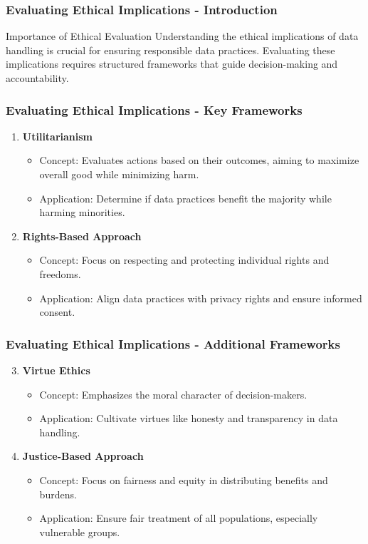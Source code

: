 \documentclass[aspectratio=169]{beamer}
\begin{document}
\begin{frame}[fragile]
    \frametitle{Evaluating Ethical Implications - Introduction}
    \begin{block}{Importance of Ethical Evaluation}
        Understanding the ethical implications of data handling is crucial for ensuring responsible data practices. Evaluating these implications requires structured frameworks that guide decision-making and accountability.
    \end{block}
\end{frame}

\begin{frame}[fragile]
    \frametitle{Evaluating Ethical Implications - Key Frameworks}
    \begin{enumerate}
        \item \textbf{Utilitarianism}
            \begin{itemize}
                \item Concept: Evaluates actions based on their outcomes, aiming to maximize overall good while minimizing harm.
                \item Application: Determine if data practices benefit the majority while harming minorities.
            \end{itemize}
        \item \textbf{Rights-Based Approach}
            \begin{itemize}
                \item Concept: Focus on respecting and protecting individual rights and freedoms.
                \item Application: Align data practices with privacy rights and ensure informed consent.
            \end{itemize}
    \end{enumerate}
\end{frame}

\begin{frame}[fragile]
    \frametitle{Evaluating Ethical Implications - Additional Frameworks}
    \begin{enumerate}
        \setcounter{enumi}{2} %
        \item \textbf{Virtue Ethics}
            \begin{itemize}
                \item Concept: Emphasizes the moral character of decision-makers.
                \item Application: Cultivate virtues like honesty and transparency in data handling.
            \end{itemize}
        \item \textbf{Justice-Based Approach}
            \begin{itemize}
                \item Concept: Focus on fairness and equity in distributing benefits and burdens.
                \item Application: Ensure fair treatment of all populations, especially vulnerable groups.
            \end{itemize}
    \end{enumerate}
\end{frame}
\end{document}
